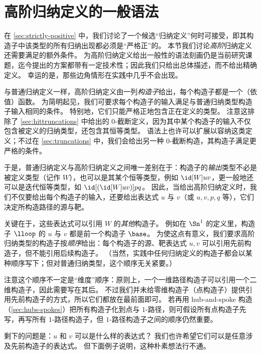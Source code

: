 \section{高阶归纳定义的一般语法}
\label{sec:naturality}

在 \cref{sec:strictly-positive} 中，我们讨论了一个候选“归纳定义”何时可接受，即其构造子中该类型的所有归纳出现都必须是“严格正”的。
本节我们讨论\emph{高阶}归纳定义还需要满足的额外条件。
为高阶归纳定义给出一般性的语法刻画仍是当前研究课题，迄今提出的方案都带有一定技术性；因此我们只给出总体描述，而不给出精确定义。
幸运的是，那些边角情形在实践中几乎不会出现。

与普通归纳定义一样，高阶归纳定义由一列\emph{构造子}给出，每个构造子都是一个（依值）函数。
为简明起见，我们可要求每个构造子的输入满足与普通归纳类型构造子输入相同的条件。
特别地，它们只能严格正地包含正在定义的类型。
注意这排除了 \cref{sec:hittruncations} 中给出的 $0$-截断定义，因为其中某个构造子的输入不仅包含被定义的归纳类型，还包含其恒等类型。
语法上也许可以扩展以容纳这类定义；不过在 \cref{sec:truncations} 中，我们会给出另一种 $0$-截断构造，其构造子满足更严格的条件。

于是，普通归纳定义与高阶归纳定义之间唯一差别在于：构造子的\emph{输出}类型不必是被定义类型（记作 $W$），也可以是其某个恒等类型，例如 $\id[W]uv$，更一般地还可以是迭代恒等类型，如 $\id[({\id[W]uv})]pq$。
因此，当给出高阶归纳定义时，我们不仅要给出每个构造子的输入，还要给出表达式 $u$ 与 $v$（或 $u,v,p,q$ 等），它们决定所构造路径的源与靶。

关键在于，这些表达式可以引用 $W$ 的\emph{其他}构造子。
例如在 $\Sn^1$ 的定义里，构造子 $\lloop$ 的 $u$ 与 $v$ 都是前一个构造子 $\base$。
为使这点有意义，我们要求高阶归纳类型的构造子按\emph{顺序}给出：每个构造子的源、靶表达式 $u,v$ 可以引用先前构造子，但不能引用后续构造子。
（当然，实践中任何归纳定义的构造子都会以某种顺序写下；但对普通归纳类型，这个顺序无关紧要。）

注意这个顺序不一定是“维度”顺序：原则上，一个一维路径构造子可以引用一个二维构造子，因此需要写在其后。
不过我们并未给零维构造子（点构造子）提供引用先前构造子的方式，所以它们都放在最前面即可。
若再用 hub-and-spoke 构造（\cref{sec:hubs-spokes}）把所有构造子化到点与 $1$-路径，则可假设所有点构造子先写，再写所有 $1$-路径构造子，但 $1$-路径构造子之间的顺序仍然重要。

剩下的问题是：$u$ 和 $v$ 可以是什么样的表达式？
我们也许希望它们可以是任意涉及先前构造子的表达式。
但下面例子说明，这种朴素想法行不通。

